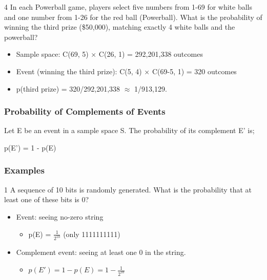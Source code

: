 \documentclass[12pt, letterpaper]{article}
\newcommand{\exheader}[1][ex]{{\tiny{#1}\normalsize}}
\begin{document}
\bigbreak
\bigbreak

\exheader[4] In each Powerball game, players select five numbers from 1-69 for white balls and one number from 1-26 for the red ball (Powerball). What is the probability of winning the third prize (\$50,000), matching exactly 4 white balls and the powerball?
\begin{itemize}[leftmargin=*,  label={}]
	\item Sample space: C(69, 5) × C(26, 1) = 292,201,338 outcomes
	\item Event (winning the third prize): C(5, 4) × C(69-5, 1) = 320 outcomes
	\item p(third prize) = 320/292,201,338 $\approx$ 1/913,129.
\end{itemize}


\pagebreak

\subsubsection*{Probability of Complements of Events}
Let E be an event in a sample space S. The probability of its complement E' is; 
\begin{center}
	p(E') = 1 - p(E)
\end{center}

\bigbreak
\bigbreak

\subsubsection*{Examples}

\exheader[1] A sequence of 10 bits is randomly generated. What is the probability that at least one of these bits is 0?
\begin{itemize}[leftmargin=*,  label={}]
	\item Event: seeing no-zero string
	\begin{itemize}
		\item p(E) = $\frac{1}{2^{10}}$ {\tiny (only 1111111111)}
	\end{itemize}
	\item Complement event: seeing at least one  0 in the string.
	\begin{itemize}
		\item $p(E') = 1 - p(E) = 1 - \frac{1}{2^{10}}$
	\end{itemize}
\end{itemize}

\bigbreak
\bigbreak
\end{document}
